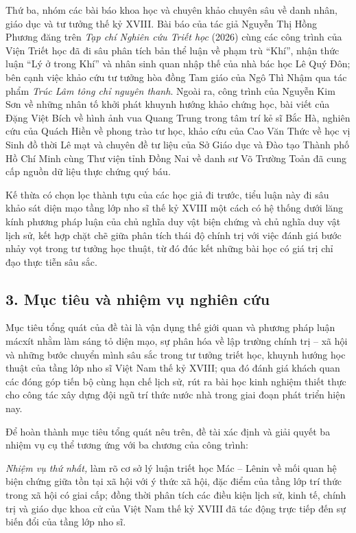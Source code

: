 Thứ ba, nhóm các bài báo khoa học và chuyên khảo chuyên sâu về danh nhân, giáo dục và tư tưởng thế kỷ XVIII. Bài báo của tác giả Nguyễn Thị Hồng Phương đăng trên \textit{Tạp chí Nghiên cứu Triết học} (2026) cùng các công trình của Viện Triết học đã đi sâu phân tích bản thể luận về phạm trù ``Khí'', nhận thức luận ``Lý ở trong Khí'' và nhân sinh quan nhập thế của nhà bác học Lê Quý Đôn; bên cạnh việc khảo cứu tư tưởng hòa đồng Tam giáo của Ngô Thì Nhậm qua tác phẩm \textit{Trúc Lâm tông chỉ nguyên thanh}. Ngoài ra, công trình của Nguyễn Kim Sơn về những nhân tố khởi phát khuynh hướng khảo chứng học, bài viết của Đặng Việt Bích về hình ảnh vua Quang Trung trong tâm trí kẻ sĩ Bắc Hà, nghiên cứu của Quách Hiền về phong trào tư học, khảo cứu của Cao Văn Thức về học vị Sinh đồ thời Lê mạt và chuyên đề tư liệu của Sở Giáo dục và Đào tạo Thành phố Hồ Chí Minh cùng Thư viện tỉnh Đồng Nai về danh sư Võ Trường Toản đã cung cấp nguồn dữ liệu thực chứng quý báu.

Kế thừa có chọn lọc thành tựu của các học giả đi trước, tiểu luận này đi sâu khảo sát diện mạo tầng lớp nho sĩ thế kỷ XVIII một cách có hệ thống dưới lăng kính phương pháp luận của chủ nghĩa duy vật biện chứng và chủ nghĩa duy vật lịch sử, kết hợp chặt chẽ giữa phân tích thái độ chính trị với việc đánh giá bước nhảy vọt trong tư tưởng học thuật, từ đó đúc kết những bài học có giá trị chỉ đạo thực tiễn sâu sắc.

\subsection*{3. Mục tiêu và nhiệm vụ nghiên cứu}

Mục tiêu tổng quát của đề tài là vận dụng thế giới quan và phương pháp luận mácxít nhằm làm sáng tỏ diện mạo, sự phân hóa về lập trường chính trị -- xã hội và những bước chuyển mình sâu sắc trong tư tưởng triết học, khuynh hướng học thuật của tầng lớp nho sĩ Việt Nam thế kỷ XVIII; qua đó đánh giá khách quan các đóng góp tiến bộ cùng hạn chế lịch sử, rút ra bài học kinh nghiệm thiết thực cho công tác xây dựng đội ngũ trí thức nước nhà trong giai đoạn phát triển hiện nay.

Để hoàn thành mục tiêu tổng quát nêu trên, đề tài xác định và giải quyết ba nhiệm vụ cụ thể tương ứng với ba chương của công trình:

\textit{Nhiệm vụ thứ nhất,} làm rõ cơ sở lý luận triết học Mác -- Lênin về mối quan hệ biện chứng giữa tồn tại xã hội với ý thức xã hội, đặc điểm của tầng lớp trí thức trong xã hội có giai cấp; đồng thời phân tích các điều kiện lịch sử, kinh tế, chính trị và giáo dục khoa cử của Việt Nam thế kỷ XVIII đã tác động trực tiếp đến sự biến đổi của tầng lớp nho sĩ.


